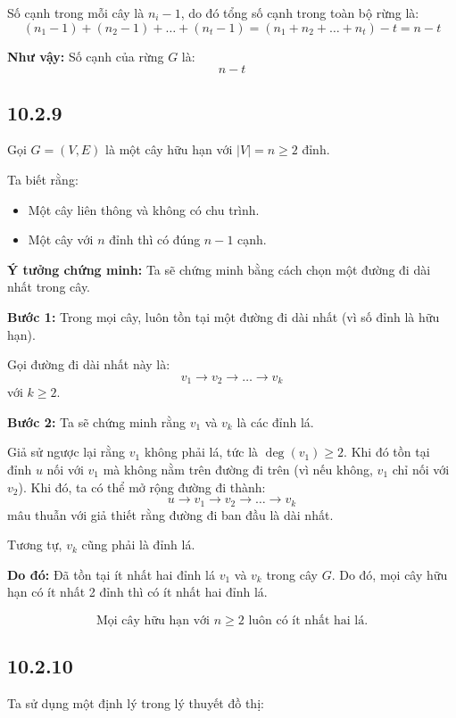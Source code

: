 \documentclass{article}
\begin{document}
	Số cạnh trong mỗi cây là $n_i - 1$, do đó tổng số cạnh trong toàn bộ rừng là:
	\[
	(n_1 - 1) + (n_2 - 1) + \dots + (n_t - 1) = (n_1 + n_2 + \dots + n_t) - t = n - t
	\]
	
	\vspace{1em}
	\noindent \textbf{Như vậy:} Số cạnh của rừng $G$ là:
	\[
	\boxed{n - t}
	\]
	
	\subsection*{10.2.9}
	Gọi $G = (V, E)$ là một cây hữu hạn với $|V| = n \geq 2$ đỉnh.
	
	Ta biết rằng:
	\begin{itemize}
		\item Một cây liên thông và không có chu trình.
		\item Một cây với $n$ đỉnh thì có đúng $n - 1$ cạnh.
	\end{itemize}
	
	\textbf{Ý tưởng chứng minh:} Ta sẽ chứng minh bằng cách chọn một đường đi dài nhất trong cây.
	
	\vspace{0.5em}
	\noindent \textbf{Bước 1:} Trong mọi cây, luôn tồn tại một đường đi dài nhất (vì số đỉnh là hữu hạn).  
	
	Gọi đường đi dài nhất này là:
	\[
	v_1 \to v_2 \to \dots \to v_k
	\]
	với $k \geq 2$.
	
	\noindent \textbf{Bước 2:} Ta sẽ chứng minh rằng $v_1$ và $v_k$ là các đỉnh lá.
	
	Giả sử ngược lại rằng $v_1$ không phải lá, tức là $\deg(v_1) \geq 2$. Khi đó tồn tại đỉnh $u$ nối với $v_1$ mà không nằm trên đường đi trên (vì nếu không, $v_1$ chỉ nối với $v_2$). Khi đó, ta có thể mở rộng đường đi thành:
	\[
	u \to v_1 \to v_2 \to \dots \to v_k
	\]
	mâu thuẫn với giả thiết rằng đường đi ban đầu là dài nhất.
	
	Tương tự, $v_k$ cũng phải là đỉnh lá.
	
	\noindent \textbf{Do đó:} Đã tồn tại ít nhất hai đỉnh lá $v_1$ và $v_k$ trong cây $G$. Do đó, mọi cây hữu hạn có ít nhất 2 đỉnh thì có ít nhất hai đỉnh lá.
	
	\[
	\boxed{\text{Mọi cây hữu hạn với } n \geq 2 \text{ luôn có ít nhất hai lá.}}
	\]
	

	\subsection*{10.2.10}
	Ta sử dụng một định lý trong lý thuyết đồ thị:
	
\end{document}
